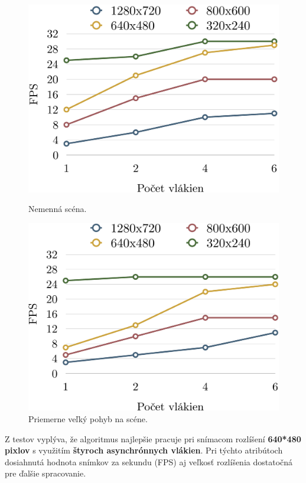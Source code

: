 \begin{figure}[H]
  \centering
  \begin{minipage}[b]{0.49\textwidth}
    \includegraphics[width=\textwidth]{images/substractorCalm}
    \caption{Nemenná scéna.}
  \end{minipage}
  \hfill
  \begin{minipage}[b]{0.49\textwidth}
    \includegraphics[width=\textwidth]{images/substractorNormal}
    \caption{Priemerne veľký pohyb na scéne.}
  \end{minipage}
\end{figure}

Z testov vyplýva, že algoritmus najlepšie pracuje pri snímacom rozlíšení \textbf{640*480 pixlov} s využitím \textbf{štyroch asynchrónnych vlákien}. Pri týchto atribútoch dosiahnutá hodnota snímkov za sekundu (FPS) aj veľkosť rozlíšenia dostatočná pre ďalšie spracovanie. 



